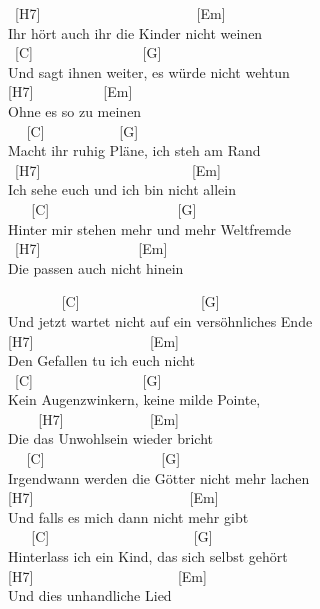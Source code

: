 \documentclass[
  letterpaper,
]{scrbook}
\begin{document}
\hspace*{0.333em} ~{[}H7{]} ~ ~ ~ ~ ~ ~ ~ ~ ~ ~ ~ ~ ~ {[}Em{]}\\
Ihr hört auch ihr die Kinder nicht weinen\\
\hspace*{0.333em} ~{[}C{]} ~ ~ ~ ~ ~ ~ ~ ~ ~ {[}G{]}\\
Und sagt ihnen weiter, es würde nicht wehtun\\
{[}H7{]} ~ ~ ~ ~ ~ ~{[}Em{]}\\
\hspace*{0.333em}Ohne es so zu meinen\\
\hspace*{0.333em} ~ ~{[}C{]} ~ ~ ~ ~ ~ ~ {[}G{]}\\
Macht ihr ruhig Pläne, ich steh am Rand\\
\hspace*{0.333em} ~{[}H7{]} ~ ~ ~ ~ ~ ~ ~ ~ ~ ~ ~ ~ ~{[}Em{]}\\
Ich sehe euch und ich bin nicht allein\\
\hspace*{0.333em} ~ ~ {[}C{]} ~ ~ ~ ~ ~ ~ ~ ~ ~ ~ ~{[}G{]}\\
Hinter mir stehen mehr und mehr Weltfremde\\
\hspace*{0.333em} ~{[}H7{]} ~ ~ ~ ~ ~ ~ ~ ~ {[}Em{]}\\
Die passen auch nicht hinein

~ ~ ~ ~ ~{[}C{]} ~ ~ ~ ~ ~ ~ ~ ~ ~ ~ {[}G{]}\\
Und jetzt wartet nicht auf ein versöhnliches Ende\\
{[}H7{]} ~ ~ ~ ~ ~ ~ ~ ~ ~ ~{[}Em{]}\\
Den Gefallen tu ich euch nicht\\
\hspace*{0.333em} ~{[}C{]} ~ ~ ~ ~ ~ ~ ~ ~ ~ {[}G{]}\\
Kein Augenzwinkern, keine milde Pointe,\\
\hspace*{0.333em} ~ ~ ~{[}H7{]} ~ ~ ~ ~ ~ ~ ~ {[}Em{]}\\
Die das Unwohlsein wieder bricht\\
\hspace*{0.333em} ~ ~{[}C{]} ~ ~ ~ ~ ~ ~ ~ ~ ~ ~{[}G{]}\\
Irgendwann werden die Götter nicht mehr lachen\\
\hspace*{0.333em} {[}H7{]} ~ ~ ~ ~ ~ ~ ~ ~ ~ ~ ~ ~ ~ {[}Em{]}\\
Und falls es mich dann nicht mehr gibt\\
\hspace*{0.333em} ~ ~ {[}C{]} ~ ~ ~ ~ ~ ~ ~ ~ ~ ~ ~ ~ {[}G{]}\\
Hinterlass ich ein Kind, das sich selbst gehört\\
{[}H7{]} ~ ~ ~ ~ ~ ~ ~ ~ ~ ~ ~ ~ {[}Em{]}\\
\hspace*{0.333em} Und dies unhandliche Lied\\
\hspace*{0.333em}
\end{document}
